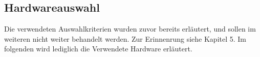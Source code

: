 \subsection{Hardwareauswahl} \label{hardwareauswahl-subsec}

Die verwendeten Auswahlkriterien wurden zuvor bereits erläutert, und sollen im weiteren nicht weiter behandelt werden. Zur Erinnenrung siehe Kapitel 5. Im folgenden wird lediglich die Verwendete Hardware erläutert.

%



